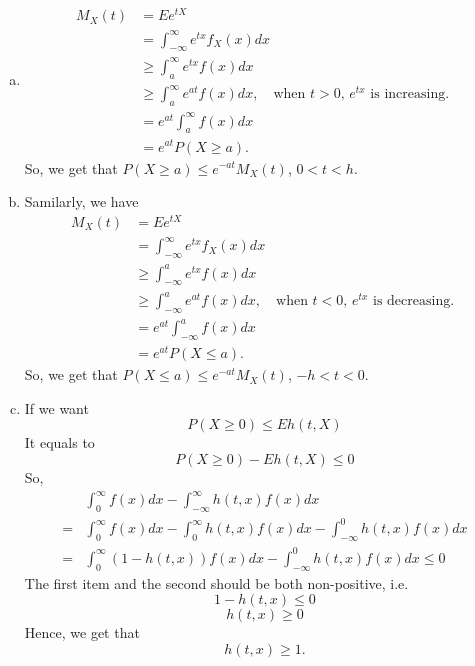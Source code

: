 \documentclass[14pt]{elegantbook}
\begin{document}
    \begin{solution}
        \begin{enumerate}[(a)]
            \item \begin{align*}
                M_X(t) &= Ee^{tX} \\
                &= \int_{-\infty}^{\infty} e^{tx}f_X(x)dx \\
                &\geq \int_{a}^{\infty} e^{tx}f(x)dx \\
                &\geq \int_{a}^{\infty} e^{at}f(x)dx, \quad \text{when $t>0$, $e^{tx}$ is increasing. }  \\
                &= e^{at}\int_{a}^{\infty} f(x)dx \\
                &= e^{at}P(X\geq a). 
            \end{align*}
            So, we get that $P(X\geq a)\leq e^{-at}M_X(t)$, $0<t<h$. 
            \item Samilarly, we have
            \begin{align*}
                M_X(t) &= Ee^{tX} \\
                &= \int_{-\infty}^{\infty} e^{tx}f_X(x)dx \\
                &\geq \int_{-\infty}^{a} e^{tx}f(x)dx \\
                &\geq \int_{-\infty}^{a} e^{at}f(x)dx, \quad \text{when $t<0$, $e^{tx}$ is decreasing. }  \\
                &= e^{at}\int_{-\infty}^{a} f(x)dx \\
                &= e^{at}P(X\leq a). 
            \end{align*}
            So, we get that $P(X\leq a)\leq e^{-at}M_X(t)$, $-h<t<0$.
            \item If we want \[P(X\geq0)\leq Eh(t,X)\]
            It equals to \[P(X\geq0)-Eh(t,X)\leq 0\]
            So, \begin{align*}
                &\int_{0}^{\infty}f(x)dx - \int_{-\infty}^{\infty} h(t,x)f(x)dx\\
                =&\int_{0}^{\infty}f(x)dx - \int_{0}^{\infty} h(t,x)f(x)dx- \int_{-\infty}^{0} h(t,x)f(x)dx\\
                =&\int_{0}^{\infty}(1-h(t, x))f(x)dx - \int_{-\infty}^{0} h(t,x)f(x)dx\leq 0
            \end{align*}
            The first item and the second should be both non-positive, i.e. 
            \[1-h(t,x)\leq 0\]
            \[h(t, x)\geq 0 \]
            Hence, we get that 
            \[h(t,x)\geq1 .\]
        \end{enumerate}
    \end{solution}
\end{document}
